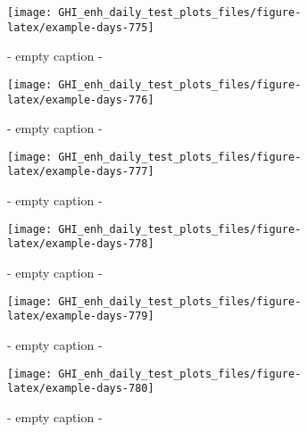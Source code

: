 \documentclass[
  10pt,
  a4paper,oneside]{article}
\begin{document}
\begin{figure}[H]

{\centering \texttt{[image: GHI\_enh\_daily\_test\_plots\_files/figure-latex/example-days-775]} 

}

\caption{ - empty caption - }\label{fig:example-days-775}
\end{figure}

\begin{figure}[H]

{\centering \texttt{[image: GHI\_enh\_daily\_test\_plots\_files/figure-latex/example-days-776]} 

}

\caption{ - empty caption - }\label{fig:example-days-776}
\end{figure}

\begin{figure}[H]

{\centering \texttt{[image: GHI\_enh\_daily\_test\_plots\_files/figure-latex/example-days-777]} 

}

\caption{ - empty caption - }\label{fig:example-days-777}
\end{figure}

\begin{figure}[H]

{\centering \texttt{[image: GHI\_enh\_daily\_test\_plots\_files/figure-latex/example-days-778]} 

}

\caption{ - empty caption - }\label{fig:example-days-778}
\end{figure}

\begin{figure}[H]

{\centering \texttt{[image: GHI\_enh\_daily\_test\_plots\_files/figure-latex/example-days-779]} 

}

\caption{ - empty caption - }\label{fig:example-days-779}
\end{figure}

\begin{figure}[H]

{\centering \texttt{[image: GHI\_enh\_daily\_test\_plots\_files/figure-latex/example-days-780]} 

}

\caption{ - empty caption - }\label{fig:example-days-780}
\end{figure}
\end{document}
